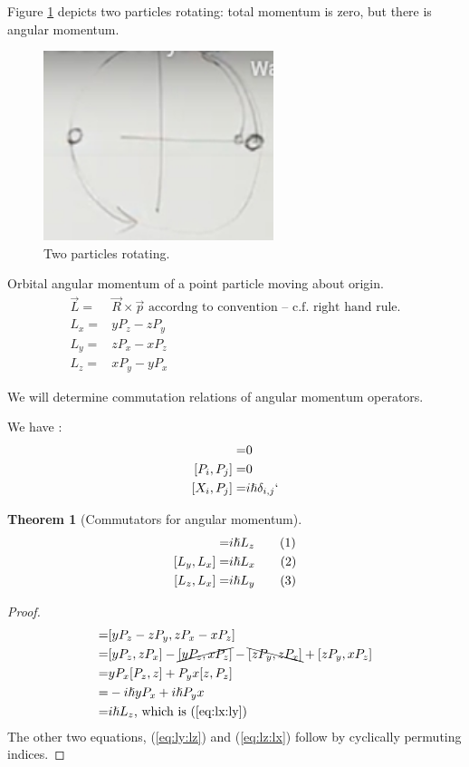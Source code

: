\documentclass[]{article}
\newcommand\numberthis{\addtocounter{equation}{1}\tag{\theequation}}
\newtheorem{thm}{Theorem}
\begin{document}
Figure \ref{fig:two:particles:rotating} depicts two particles rotating: total momentum is zero, but there is angular momentum.
\begin{figure}[H]
	\caption{Two particles rotating.}\label{fig:two:particles:rotating}
	\includegraphics[width=0.6\textwidth]{two-particles-rotating}
\end{figure}

Orbital angular momentum of a point particle moving about origin. 
\begin{align*}
\vec{L} =& \vec{R} \times \vec{p} \text{ accordng to convention -- c.f. right hand rule.}\\
L_x =& y P_z - z P_y\\
L_y =& z P_x - x P_z\\
L_z =& x P_y - y P_x
\end{align*}

We will determine commutation relations of angular momentum operators.

We have \cite{susskind2014quantum}:
\begin{align*}
	[X_i,X_j] =& 0\\
	[P_i,P_j]=& 0\\
	[X_i,P_j]=& i \hslash \delta_{i,j}`
\end{align*}

\begin{thm}[Commutators for angular momentum]
	\begin{align*}
	[L_x,L_y]=& i \hslash L_z \numberthis \label{eq:lx:ly}\\
	[L_y,L_x]=& i \hslash L_x \numberthis \label{eq:ly:lz}\\
	[L_z,L_x]=& i \hslash L_y \numberthis \label{eq:lz:lx}	
	\end{align*}
\end{thm}
\begin{proof}
	\begin{align*}
	[L_x,L_y]=& [y P_z - z P_y,z P_x - x P_z]\\
	=&[y P_z, z P_x] -\cancel{[yP_z,xP_z]} -\bcancel{[zP_y,zP_x]} + [z P_y,x P_z] \\
	=& y P_x[P_z,z] + P_y x[z,P_z]\\
	=& -i \hslash y P_x + i \hslash P_y x\\
	=& i \hslash L_z \text{, which is (\ref{eq:lx:ly})} 
	\end{align*}
	The other two equations, (\ref{eq:ly:lz}) and (\ref{eq:lz:lx}) follow by cyclically permuting indices.
\end{proof}
\end{document}
